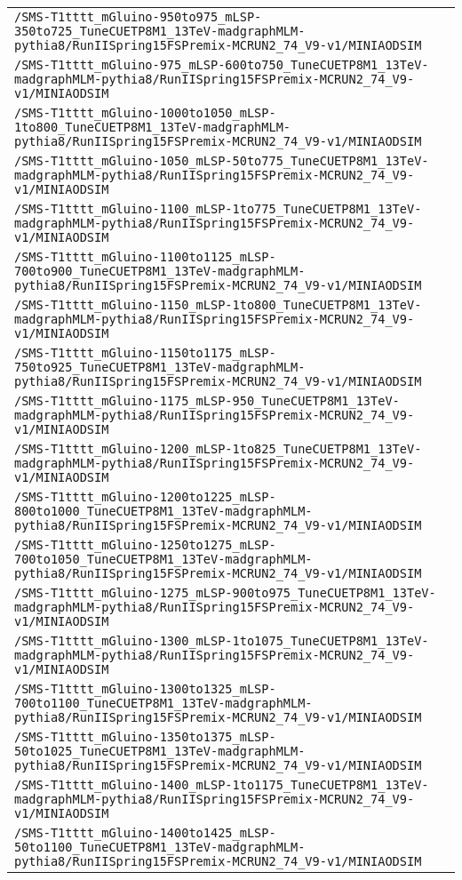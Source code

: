 \begin{center}
\begin{tabular}{l}
\verb!/SMS-T1tttt_mGluino-950to975_mLSP-350to725_TuneCUETP8M1_13TeV-madgraphMLM-pythia8/RunIISpring15FSPremix-MCRUN2_74_V9-v1/MINIAODSIM! \tabularnewline
\verb!/SMS-T1tttt_mGluino-975_mLSP-600to750_TuneCUETP8M1_13TeV-madgraphMLM-pythia8/RunIISpring15FSPremix-MCRUN2_74_V9-v1/MINIAODSIM! \tabularnewline
\verb!/SMS-T1tttt_mGluino-1000to1050_mLSP-1to800_TuneCUETP8M1_13TeV-madgraphMLM-pythia8/RunIISpring15FSPremix-MCRUN2_74_V9-v1/MINIAODSIM! \tabularnewline
\verb!/SMS-T1tttt_mGluino-1050_mLSP-50to775_TuneCUETP8M1_13TeV-madgraphMLM-pythia8/RunIISpring15FSPremix-MCRUN2_74_V9-v1/MINIAODSIM! \tabularnewline
\verb!/SMS-T1tttt_mGluino-1100_mLSP-1to775_TuneCUETP8M1_13TeV-madgraphMLM-pythia8/RunIISpring15FSPremix-MCRUN2_74_V9-v1/MINIAODSIM! \tabularnewline
\verb!/SMS-T1tttt_mGluino-1100to1125_mLSP-700to900_TuneCUETP8M1_13TeV-madgraphMLM-pythia8/RunIISpring15FSPremix-MCRUN2_74_V9-v1/MINIAODSIM! \tabularnewline
\verb!/SMS-T1tttt_mGluino-1150_mLSP-1to800_TuneCUETP8M1_13TeV-madgraphMLM-pythia8/RunIISpring15FSPremix-MCRUN2_74_V9-v1/MINIAODSIM! \tabularnewline
\verb!/SMS-T1tttt_mGluino-1150to1175_mLSP-750to925_TuneCUETP8M1_13TeV-madgraphMLM-pythia8/RunIISpring15FSPremix-MCRUN2_74_V9-v1/MINIAODSIM! \tabularnewline
\verb!/SMS-T1tttt_mGluino-1175_mLSP-950_TuneCUETP8M1_13TeV-madgraphMLM-pythia8/RunIISpring15FSPremix-MCRUN2_74_V9-v1/MINIAODSIM! \tabularnewline
\verb!/SMS-T1tttt_mGluino-1200_mLSP-1to825_TuneCUETP8M1_13TeV-madgraphMLM-pythia8/RunIISpring15FSPremix-MCRUN2_74_V9-v1/MINIAODSIM! \tabularnewline
\verb!/SMS-T1tttt_mGluino-1200to1225_mLSP-800to1000_TuneCUETP8M1_13TeV-madgraphMLM-pythia8/RunIISpring15FSPremix-MCRUN2_74_V9-v1/MINIAODSIM! \tabularnewline
\verb!/SMS-T1tttt_mGluino-1250to1275_mLSP-700to1050_TuneCUETP8M1_13TeV-madgraphMLM-pythia8/RunIISpring15FSPremix-MCRUN2_74_V9-v1/MINIAODSIM! \tabularnewline
\verb!/SMS-T1tttt_mGluino-1275_mLSP-900to975_TuneCUETP8M1_13TeV-madgraphMLM-pythia8/RunIISpring15FSPremix-MCRUN2_74_V9-v1/MINIAODSIM! \tabularnewline
\verb!/SMS-T1tttt_mGluino-1300_mLSP-1to1075_TuneCUETP8M1_13TeV-madgraphMLM-pythia8/RunIISpring15FSPremix-MCRUN2_74_V9-v1/MINIAODSIM! \tabularnewline
\verb!/SMS-T1tttt_mGluino-1300to1325_mLSP-700to1100_TuneCUETP8M1_13TeV-madgraphMLM-pythia8/RunIISpring15FSPremix-MCRUN2_74_V9-v1/MINIAODSIM! \tabularnewline
\verb!/SMS-T1tttt_mGluino-1350to1375_mLSP-50to1025_TuneCUETP8M1_13TeV-madgraphMLM-pythia8/RunIISpring15FSPremix-MCRUN2_74_V9-v1/MINIAODSIM! \tabularnewline
\verb!/SMS-T1tttt_mGluino-1400_mLSP-1to1175_TuneCUETP8M1_13TeV-madgraphMLM-pythia8/RunIISpring15FSPremix-MCRUN2_74_V9-v1/MINIAODSIM! \tabularnewline
\verb!/SMS-T1tttt_mGluino-1400to1425_mLSP-50to1100_TuneCUETP8M1_13TeV-madgraphMLM-pythia8/RunIISpring15FSPremix-MCRUN2_74_V9-v1/MINIAODSIM! \tabularnewline

\end{tabular}
\end{center}
